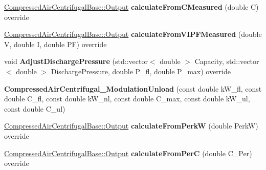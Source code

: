 \begin{DoxyCompactItemize}
\hyperlink{struct_compressed_air_centrifugal_base_1_1_output}{Compressed\+Air\+Centrifugal\+Base\+::\+Output} {\bfseries calculate\+From\+C\+Measured} (double C) override
\item 
\mbox{\label{class_compressed_air_centrifugal___modulation_unload_a018311cd6ce4ae873dcff461b31f73e7}} 
\hyperlink{struct_compressed_air_centrifugal_base_1_1_output}{Compressed\+Air\+Centrifugal\+Base\+::\+Output} {\bfseries calculate\+From\+V\+I\+P\+F\+Measured} (double V, double I, double PF) override
\item 
\mbox{\label{class_compressed_air_centrifugal___modulation_unload_adbfdbf6e38b380add5012b94aa981ac7}} 
void {\bfseries Adjust\+Discharge\+Pressure} (std\+::vector$<$ double $>$ Capacity, std\+::vector$<$ double $>$ Discharge\+Pressure, double P\+\_\+fl, double P\+\_\+max) override
\item 
\mbox{\label{class_compressed_air_centrifugal___modulation_unload_a85df431a4be6f96ba472e765472cc906}} 
{\bfseries Compressed\+Air\+Centrifugal\+\_\+\+Modulation\+Unload} (const double k\+W\+\_\+fl, const double C\+\_\+fl, const double k\+W\+\_\+nl, const double C\+\_\+max, const double k\+W\+\_\+ul, const double C\+\_\+ul)
\item 
\mbox{\label{class_compressed_air_centrifugal___modulation_unload_a025968bea6cfe8b54905135cc6d3868d}} 
\hyperlink{struct_compressed_air_centrifugal_base_1_1_output}{Compressed\+Air\+Centrifugal\+Base\+::\+Output} {\bfseries calculate\+From\+PerkW} (double PerkW) override
\item 
\mbox{\label{class_compressed_air_centrifugal___modulation_unload_aa9eac2956d8db760b6a8c2cd6608f0e4}} 
\hyperlink{struct_compressed_air_centrifugal_base_1_1_output}{Compressed\+Air\+Centrifugal\+Base\+::\+Output} {\bfseries calculate\+From\+PerC} (double C\+\_\+\+Per) override
\item 
\mbox{\label{class_compressed_air_centrifugal___modulation_unload_ad3d891a99ba2eec2e710a12382fcb3d5}} 

\end{DoxyCompactItemize}

